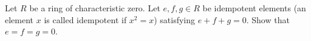 Let \(R\) be a ring of characteristic zero. Let \(e,f,g\in R\) be idempotent elements (an element \(x\) is called idempotent if \(x^2=x\)) satisfying \(e+f+g=0\). Show that \(e=f=g=0\).